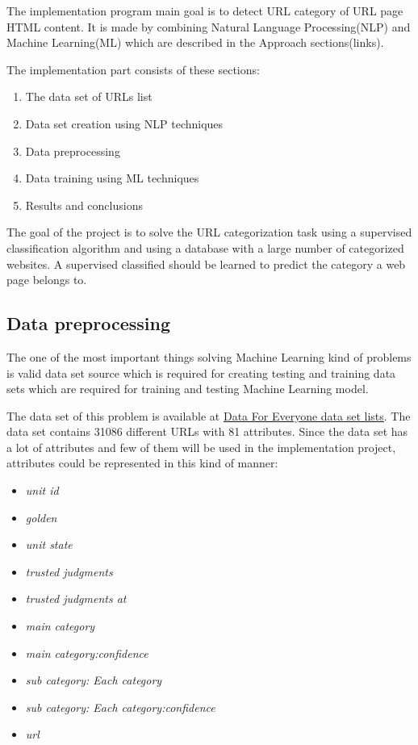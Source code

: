 The implementation program main goal is to detect URL category of URL page HTML content. It is made by combining Natural Language Processing(NLP) and Machine Learning(ML) which are described in the Approach sections(links). 

The implementation part consists of these sections:

\begin{enumerate}
    \item {The data set of URLs list}
    \item {Data set creation using NLP techniques}
    \item {Data preprocessing}
    \item {Data training using ML techniques}
    \item {Results and conclusions}
\end{enumerate}


The goal of the project is to solve the URL categorization task using a supervised classification algorithm and using a database with a large number of categorized websites. A supervised classified
should be learned to predict the category a web page belongs to.



\subsection{Data preprocessing}

The one of the most important things solving Machine Learning kind of problems is valid data set source which is required for creating testing and training data sets which are required for training and testing Machine Learning model.

The data set of this problem is available at \href{https://www.figure-eight.com/data-for-everyone/}{Data For Everyone data set lists}. The data set contains 31086 different URLs with 81 attributes. Since the data set has a lot of attributes and few of them will be used in the implementation project, attributes could be represented in this kind of manner:
\begin{itemize}
    \item \textit{unit id}
    \item \textit{golden}
    \item \textit{unit state}
    \item \textit{trusted judgments}
    \item \textit{trusted judgments at}
    \item \textit{main category}
    \item \textit{main category:confidence}
    \item \textit{sub category: Each category}
    \item \textit{sub category: Each category:confidence}
    \item \textit{url}
\end{itemize}

